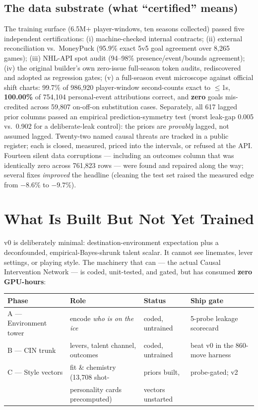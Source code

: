 \documentclass[11pt]{article}
\begin{document}
\subsection{The data substrate (what ``certified'' means)}

The training surface (6.5M+ player-windows, ten seasons collected) passed five
independent certifications: (i) machine-checked internal contracts; (ii) external
reconciliation vs.\ MoneyPuck (95.9\% exact 5v5 goal agreement over 8,265 games);
(iii) NHL-API spot audit (94--98\% presence/event/bounds agreement); (iv) the original
builder's own zero-issue full-season token audits, rediscovered and adopted as
regression gates; (v) a full-season event microscope against official shift charts:
99.7\% of 986{,}920 player-window second-counts exact to $\le$1s, \textbf{100.00\%} of
754{,}104 personal-event attributions correct, and \textbf{zero} goals mis-credited
across 59{,}807 on-off-on substitution cases. Separately, all 617 lagged prior columns
passed an empirical prediction-symmetry test (worst leak-gap 0.005 vs.\ 0.902 for a
deliberate-leak control): the priors are \emph{provably} lagged, not assumed lagged.
Twenty-two named causal threats are tracked in a public register; each is closed,
measured, priced into the intervals, or refused at the API. Fourteen silent data
corruptions --- including an outcomes column that was identically zero across 761{,}823
rows --- were found and repaired along the way; several fixes \emph{improved} the
headline (cleaning the test set raised the measured edge from $-8.6\%$ to $-9.7\%$).

\section{What Is Built But Not Yet Trained}

v0 is deliberately minimal: destination-environment expectation plus a deconfounded,
empirical-Bayes-shrunk talent scalar. It cannot see linemates, lever settings, or
playing style. The machinery that can --- the actual Causal Intervention Network ---
is coded, unit-tested, and gated, but has consumed \textbf{zero GPU-hours}:

\begin{center}
\begin{tabular}{@{}llll@{}}
\toprule
Phase & Role & Status & Ship gate \\
\midrule
A --- Environment tower & encode \emph{who is on the ice} & coded, untrained &
5-probe leakage scorecard \\
B --- CIN trunk & levers, talent channel, outcomes & coded, untrained &
beat v0 in the 860-move harness \\
C --- Style vectors & fit \& chemistry (13,708 shot- & priors built, &
probe-gated; v2 \\
 & personality cards precomputed) & vectors unstarted & \\
\bottomrule
\end{tabular}
\end{center}
\end{document}
